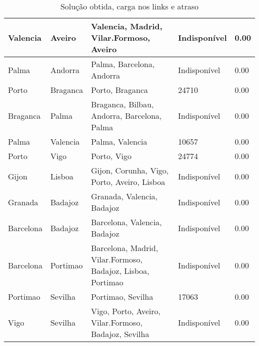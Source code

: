 \begin{table}[!htb]
{\begin{tabular}{|l|l|l|l|l|}
Valencia & Aveiro & Valencia, Madrid, Vilar.Formoso, Aveiro & Indisponível & 0.00 \\ \hline
Palma & Andorra & Palma, Barcelona, Andorra & Indisponível & 0.00 \\ \hline
Porto & Braganca & Porto, Braganca & 24710 & 0.00 \\ \hline
Braganca & Palma & Braganca, Bilbau, Andorra, Barcelona, Palma & Indisponível & 0.00 \\ \hline
Palma & Valencia & Palma, Valencia & 10657 & 0.00 \\ \hline
Porto & Vigo & Porto, Vigo & 24774 & 0.00 \\ \hline
Gijon & Lisboa & Gijon, Corunha, Vigo, Porto, Aveiro, Lisboa & Indisponível & 0.00 \\ \hline
Granada & Badajoz & Granada, Valencia, Badajoz & Indisponível & 0.00 \\ \hline
Barcelona & Badajoz & Barcelona, Valencia, Badajoz & Indisponível & 0.00 \\ \hline
Barcelona & Portimao & Barcelona, Madrid, Vilar.Formoso, Badajoz, Lisboa, Portimao & Indisponível & 0.00 \\ \hline
Portimao & Sevilha & Portimao, Sevilha & 17063 & 0.00 \\ \hline
Vigo & Sevilha & Vigo, Porto, Aveiro, Vilar.Formoso, Badajoz, Sevilha & Indisponível & 0.00 \\ \hline
\end{tabular}}
\caption[]{Solução obtida, carga nos links e atraso}
\end{table}


